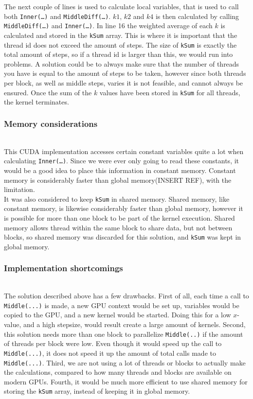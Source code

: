 The next couple of lines is used to calculate local variables, that is used to call both \texttt{Inner(…)} and \texttt{MiddleDiff(…)}. $k1$, $k2$ and $k4$ is then calculated by calling \texttt{MiddleDiff(…)} and \texttt{Inner(…)}. In line 16 the weighted average of each $k$ is calculated and stored in the \texttt{kSum} array. This is where it is important that the thread id does not exceed the amount of steps. The size of \texttt{kSum} is exactly the total amount of steps, so if a thread id is larger than this, we would run into problems. A solution could be to always make sure that the number of threads you have is equal to the amount of steps to be taken, however since both threads per block, as well as middle steps, varies it is not feasible, and cannot always be ensured. Once the sum of the $k$ values have been stored in \texttt{kSum} for all threads, the kernel terminates.

\subsubsection{Memory considerations} \hfill \\
This CUDA implementation accesses certain constant variables quite a lot when calculating \texttt{Inner(…)}. Since we were ever only going to read these constants, it would be a good idea to place this information in constant memory. Constant memory is considerably faster than global memory(INSERT REF), with the limitation.\\

It was also considered to keep \texttt{kSum} in shared memory. Shared memory, like constant memory, is likewise considerably faster than global memory, however it is possible for more than one block to be part of the kernel execution. Shared memory allows thread within the same block to share data, but not between blocks, so shared memory was discarded for this solution, and \texttt{kSum} was kept in global memory.

\subsubsection{Implementation shortcomings} \hfill \\
\label{label:shortages}
The solution described above has a few drawbacks. First of all, each time a call to \texttt{Middle(...)} is made, a new GPU context would be set up, variables would be copied to the GPU, and a new kernel would be started. Doing this for a low $x$-value, and a high stepsize, would result create a large amount of kernels. Second, this solution needs more than one block to parallelize \texttt{Middle(..)} if the amount of threads per block were low. Even though it would speed up the call to \texttt{Middle(...)}, it does not speed it up the amount of total calls made to \texttt{Middle(...)}. Third, we are not using a lot of threads or blocks to actually make the calculations, compared to how many threads and blocks are available on modern GPUs. Fourth, it would be much more efficient to use shared memory for storing the \texttt{kSum} array, instead of keeping it in global memory.\\

